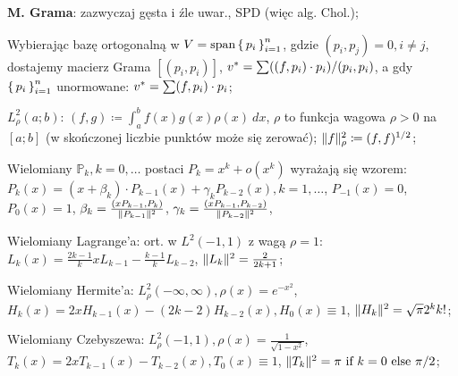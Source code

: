 \entry
\textbf{M. Grama}: zazwyczaj gęsta i źle uwar., SPD (więc alg. Chol.);

\entry
Wybierając bazę ortogonalną w $V = \text{span}\set{p_i}^n_{i=1}$,
gdzie $(p_i, p_j) = 0, i \neq j$, dostajemy macierz Grama
$[(p_i, p_i)]$,
$v^{*} = \sum((f,p_i)\cdot p_i)/(p_i, p_i)$,
a gdy $\set{p_i}^n_{i=1}$ unormowane:
$v^{*} = \sum(f,p_i)\cdot p_i$;

\entry
$L^2_\rho(a;b)$:
$(f,g) \coloneqq \int^b_a f(x)g(x)\rho(x) \ dx$,
$\rho$ to funkcja wagowa $\rho > 0$ na $[a;b]$
(w skończonej liczbie punktów może się zerować);
$\|f\|^2_\rho \coloneqq (f,f)^{1/2}$;

\entry
Wielomiany $\mathbb{P}_k, k=0,\ldots$ postaci
$P_k = x^k + o(x^k)$ wyrażają się wzorem:
$P_k(x) = (x + \beta_k) \cdot P_{k-1}(x) + \gamma_k P_{k-2}(x), k=1,\ldots$,
$P_{-1}(x)=0$,
$P_{0}(x)=1$,
$\beta_k= \frac{(x P_{k-1}, P_k)}{\|P_{k-1}\|^2}$,
$\gamma_k = \frac{(x P_{k-1}, P_{k-2})}{\|P_{k-2}\|^2}$,

\entry
Wielomiany Lagrange'a:
ort. w $L^2(-1,1)$ z wagą $\rho = 1$:
$L_k(x) = \frac{2k-1}{k}xL_{k-1} - \frac{k-1}{k}L_{k-2}$,
$\|L_k\|^2=\frac{2}{2k+1}$;

\entry
Wielomiany Hermite'a:
$L^2_\rho(-\infty, \infty), \rho(x)=e^{-x^2}$,
$H_k(x) = 2xH_{k-1}(x) - (2k-2) H_{k-2}(x), H_0(x) \equiv 1$,
$\|H_k\|^2 = \sqrt{\pi}2^kk!$;

\entry
Wielomiany Czebyszewa:
$L_\rho^2(-1,1), \rho(x)=\frac{1}{\sqrt{1-x^2}}$,
$T_k(x) = 2xT_{k-1}(x) - T_{k-2}(x), T_0(x)\equiv 1$,
$\|T_k\|^2 = \pi \text{ if } k=0 \text{ else } \pi/2$;
